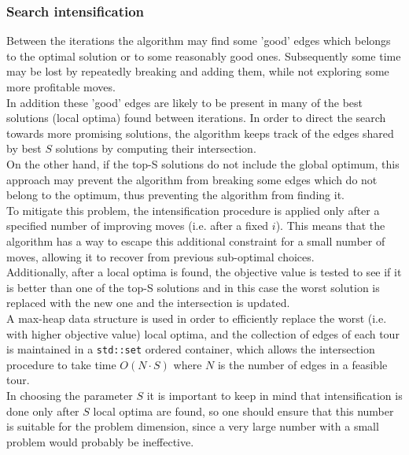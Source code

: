 \subsubsection{Search intensification}
\label{sssec:intensification}
Between the iterations the algorithm may find some 'good' edges which belongs to the optimal solution or to some reasonably good ones. Subsequently some time may be lost by repeatedly breaking and adding them, while not exploring some more profitable moves. \\
In addition these 'good' edges are likely to be present in many of the best solutions (local optima) found between iterations. In order to direct the search towards more promising solutions, the algorithm keeps track of the edges shared by best $S$ solutions by computing their intersection.\\ 
On the other hand, if the top-S solutions do not include the global optimum, this approach  may prevent the algorithm from breaking some edges which do not belong to the optimum, thus preventing the algorithm from finding it.\\ To mitigate this problem, the intensification procedure is applied only after a specified number of improving moves (i.e. after a fixed $i$). This means that the algorithm has a way to escape this additional constraint for a small number of moves, allowing it to recover from previous sub-optimal choices.\\ 
Additionally, after a local optima is found, the objective value is tested to see if it is better than one of the top-S solutions and in this case the worst solution is replaced with the new one and the intersection is updated.\\
A max-heap data structure is used in order to efficiently replace the worst (i.e. with higher objective value) local optima, and the collection of edges of each tour is maintained in a \texttt{std::set} ordered container, which allows the intersection procedure to take time $O(N\cdot S)$ where $N$ is the number of edges in a feasible tour.\\
In choosing the parameter $S$ it is important to keep in mind that intensification is done only after $S$ local optima are found, so one should ensure that this number is suitable for the problem dimension, since a very large number with a small problem would probably be ineffective.

